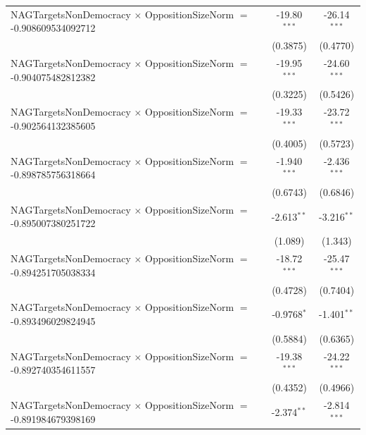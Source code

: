 \begin{tabular}{lcc}
   NAGTargetsNonDemocracy $\times$ OppositionSizeNorm $=$ -0.908609534092712    & -19.80$^{***}$       & -26.14$^{***}$\\   
                                                                                & (0.3875)             & (0.4770)\\   
   NAGTargetsNonDemocracy $\times$ OppositionSizeNorm $=$ -0.904075482812382    & -19.95$^{***}$       & -24.60$^{***}$\\   
                                                                                & (0.3225)             & (0.5426)\\   
   NAGTargetsNonDemocracy $\times$ OppositionSizeNorm $=$ -0.902564132385605    & -19.33$^{***}$       & -23.72$^{***}$\\   
                                                                                & (0.4005)             & (0.5723)\\   
   NAGTargetsNonDemocracy $\times$ OppositionSizeNorm $=$ -0.898785756318664    & -1.940$^{***}$       & -2.436$^{***}$\\   
                                                                                & (0.6743)             & (0.6846)\\   
   NAGTargetsNonDemocracy $\times$ OppositionSizeNorm $=$ -0.895007380251722    & -2.613$^{**}$        & -3.216$^{**}$\\   
                                                                                & (1.089)              & (1.343)\\   
   NAGTargetsNonDemocracy $\times$ OppositionSizeNorm $=$ -0.894251705038334    & -18.72$^{***}$       & -25.47$^{***}$\\   
                                                                                & (0.4728)             & (0.7404)\\   
   NAGTargetsNonDemocracy $\times$ OppositionSizeNorm $=$ -0.893496029824945    & -0.9768$^{*}$        & -1.401$^{**}$\\   
                                                                                & (0.5884)             & (0.6365)\\   
   NAGTargetsNonDemocracy $\times$ OppositionSizeNorm $=$ -0.892740354611557    & -19.38$^{***}$       & -24.22$^{***}$\\   
                                                                                & (0.4352)             & (0.4966)\\   
   NAGTargetsNonDemocracy $\times$ OppositionSizeNorm $=$ -0.891984679398169    & -2.374$^{**}$        & -2.814$^{***}$\\   

\end{tabular}
